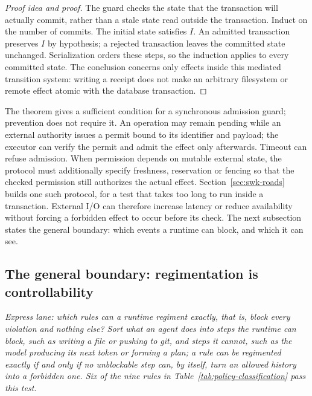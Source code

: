 \documentclass[11pt,a4paper]{article}
\theoremstyle{definition}
\theoremstyle{remark}
\begin{document}
\begin{proof}[Proof idea and proof]
The guard checks the state that the transaction will actually commit, rather
than a stale state read outside the transaction. Induct on the number of
commits. The initial state satisfies $I$. An admitted transaction preserves
$I$ by hypothesis; a rejected transaction leaves the committed state
unchanged. Serialization orders these steps, so the induction applies to
every committed state. The conclusion concerns only effects inside this
mediated transition system: writing a receipt does not make an arbitrary
filesystem or remote effect atomic with the database transaction.
\end{proof}

The theorem gives a sufficient condition for a synchronous admission guard;
prevention does not require it. An operation may remain pending while
an external authority issues a permit bound to its identifier and payload;
the executor can verify the permit and admit the effect only afterwards.
Timeout can refuse admission. When permission depends on mutable external
state, the protocol must additionally specify freshness, reservation or
fencing so that the checked permission still authorizes the actual effect.
Section~\ref{sec:swk-roads} builds one such protocol, for a test that takes
too long to run inside a transaction.
External I/O can therefore increase latency or reduce availability without
forcing a forbidden effect to occur before its check. The next subsection
states the general boundary: which events a runtime can block, and which it
can see.


\subsection{The general boundary: regimentation is controllability}
\label{sec:controllability}

\noindent\emph{Express lane: which rules can a runtime regiment exactly, that
is, block every violation and nothing else? Sort what an agent does into steps
the runtime can block, such as writing a file or pushing to git, and steps it
cannot, such as the model producing its next token or forming a plan; a rule
can be regimented exactly if and only if no
%
unblockable step can, by itself, turn an allowed history into a forbidden one.
Six of the nine rules in Table~\ref{tab:policy-classification} pass this
test.}
\end{document}

